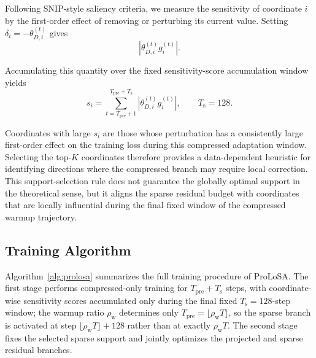 Following SNIP-style saliency criteria, we measure the sensitivity of coordinate $i$ by the first-order effect of removing or perturbing its current value.
Setting $\delta_i=-\theta_{D,i}^{(t)}$ gives
\begin{equation}
\left|
\theta_{D,i}^{(t)}g_i^{(t)}
\right|.
\label{eq:app_single_step_snip_score}
\end{equation}

Accumulating this quantity over the fixed sensitivity-score accumulation window yields
\begin{equation}
s_i
=
\sum_{t=T_{\mathrm{pre}}+1}^{T_{\mathrm{pre}}+T_{\mathrm{s}}}
\left|
\theta_{D,i}^{(t)}g_i^{(t)}
\right|,
\qquad
T_{\mathrm{s}}=128.
\label{eq:app_warmup_snip_score}
\end{equation}

Coordinates with large $s_i$ are those whose perturbation has a consistently large first-order effect on the training loss during this compressed adaptation window.
Selecting the top-$K$ coordinates therefore provides a data-dependent heuristic for identifying directions where the compressed branch may require local correction.
This support-selection rule does not guarantee the globally optimal support in the theoretical sense, but it aligns the sparse residual budget with coordinates that are locally influential during the final fixed window of the compressed warmup trajectory.


\subsection{Training Algorithm}
\label{app:algorithm}

Algorithm~\ref{alg:prolosa} summarizes the full training procedure of {ProLoSA}.
The first stage performs compressed-only training for $T_{\mathrm{pre}}+T_{\mathrm{s}}$ steps, with coordinate-wise sensitivity scores accumulated only during the final fixed $T_{\mathrm{s}}=128$-step window; the warmup ratio $\rho_{\mathrm{w}}$ determines only $T_{\mathrm{pre}}=\lfloor\rho_{\mathrm{w}}T\rfloor$, so the sparse branch is activated at step $\lfloor\rho_{\mathrm{w}}T\rfloor+128$ rather than at exactly $\rho_{\mathrm{w}}T$.
The second stage fixes the selected sparse support and jointly optimizes the projected and sparse residual branches.

